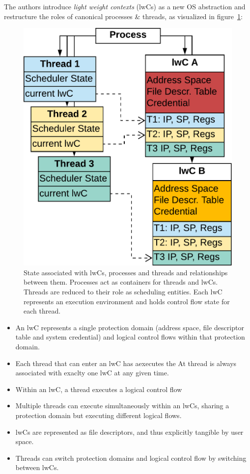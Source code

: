 \documentclass[10pt,twocolumn,letter]{article}
\begin{document}
The authors introduce \textit{light weight contexts} (lwCs) as a new OS abstraction and restructure the roles of canonical processes \& threads, as visualized in figure~\ref{design:fig:lwcprocthreadrelationship}:

\begin{figure}[h]
  \label{design:fig:lwcprocthreadrelationship}
  \includegraphics[width=\linewidth]{fig/lwc-proc-thread-relationship}
  \caption{
    State associated with lwCs, processes and threads and relationships between them.
    Processes act as containers for threads and lwCs.
    Threads are reduced to their role as scheduling entities.
    Each lwC represents an execution environment and holds control flow state for each thread.
  }
\end{figure}

\begin{itemize}
\item An lwC represents a single protection domain (address space, file descriptor table and system credential) and logical control flows within that protection domain.
\item Each thread that can enter an lwC has aexecutes the At thread is always associated with exaclty one lwC at any given time.
\item Within an lwC, a thread executes a logical control flow 
\item Multiple threads can execute simultaneously within an lwCs, sharing a protection domain but executing different logical flows.
\item lwCs are represented as file descriptors, and thus explicitly tangible by user space.
\item Threads can switch protection domains and logical control flow by switching between lwCs.
\end{itemize}
\end{document}
